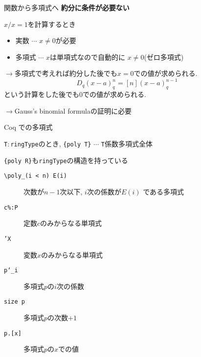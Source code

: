 \documentclass[dvipdfmx,cjk]{beamer}
\theoremstyle{mystyle}
\newcommand{\0}{\textbf{0}}
\begin{document}
\begin{frame}{関数から多項式へ} \pause
	\textbf{約分に条件が必要ない} \pause
	
	$x / x = 1$を計算するとき
	\begin{itemize}
		\item 実数 $\cdots$ $x \ne 0$が必要 \pause
		\item 多項式 $\cdots$ $x$は単項式なので自動的に $x \ne 0$(ゼロ多項式) \pause
	\end{itemize}
	$\to$多項式で考えれば約分した後でも$x = 0$での値が求められる. \pause
	\[
	  D_q (x - a)^n_q = [n](x - a)^{n - 1}_q
	\]
	という計算をした後でも$0$での値が求められる. \pause
	
	$\to$Gauss's binomial formulaの証明に必要
\end{frame}

%	

\begin{frame}{Coq での多項式}

	{\tt T}$\colon${\tt ringType}のとき, {\tt \{poly T\}} $\cdots$ {\tt T}係数多項式全体 
	\pause
	
	{\tt \{poly R\}}も{\tt ringType}の構造を持っている \pause
	\begin{description}
	  \item[\tt \textbackslash poly\_(i < n) E(i)] 次数が$n - 1$次以下, $i$次の係数が$E(i)$
	    である多項式
	  \item[\tt c\%:P] 定数$c$のみからなる単項式
	  \item[\tt 'X] 変数$x$のみからなる単項式
	  \item[\tt p`\_i] 多項式$p$の$i$次の係数 
	  \item[\tt size p] 多項式$p$の次数$+1$
	  \item[{\tt p.[x]}] 多項式$p$の$x$での値 
	\end{description}
\end{frame}
\end{document}
